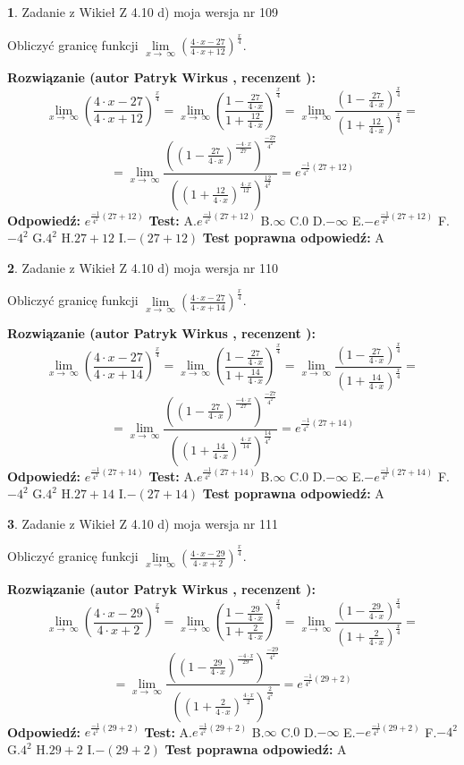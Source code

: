 \documentclass[12pt, a4paper]{article}
\theoremstyle{definition} %
\newtheorem{zad}{}
\newcommand{\zadStart}[1]{\begin{zad}#1\newline}
\newcommand{\zadStop}{\end{zad}}
\newcommand{\rozwStart}[2]{\noindent \textbf{Rozwiązanie (autor #1 , recenzent #2): }\newline}
\newcommand{\rozwStop}{\newline}
\newcommand{\odpStart}{\noindent \textbf{Odpowiedź:}\newline}
\newcommand{\odpStop}{\newline}
\newcommand{\testStart}{\noindent \textbf{Test:}\newline}
\newcommand{\testStop}{\newline}
\newcommand{\kluczStart}{\noindent \textbf{Test poprawna odpowiedź:}\newline}
\newcommand{\kluczStop}{\newline}
\begin{document}
\zadStart{Zadanie z Wikieł Z 4.10 d) moja wersja nr 109}


Obliczyć granicę funkcji  $\lim\limits_{x\to\ \infty}(\frac{4\cdot x-27}{4\cdot x+12})^{\frac{x}{4}}$.
\zadStop
\rozwStart{Patryk Wirkus}{}
$$\lim\limits_{x\to\ \infty}(\frac{4\cdot x-27}{4\cdot x+12})^{\frac{x}{4}} = \lim\limits_{x\to\ \infty}(\frac{1-\frac{27}{4\cdot x}}{1+\frac{12}{4\cdot x}})^{\frac{x}{4}}=\lim\limits_{x\to\ \infty}\frac{(1-\frac{27}{4\cdot x})^{\frac{x}{4}}}{(1+\frac{12}{4\cdot x})^{\frac{x}{4}}}=$$
$$=\lim\limits_{x\to\ \infty}\frac{((1-\frac{27}{4\cdot x})^{\frac{-4\cdot x}{27}})^{\frac{-27}{4^{2}}}}{((1+\frac{12}{4\cdot x})^{\frac{4\cdot x}{12}})^{\frac{12}{4^{2}}}}=e^{\frac{-1}{4^{2}}(27+12)}$$
\rozwStop
\odpStart
$e^{\frac{-1}{4^{2}}(27+12)}$
\odpStop
\testStart
A.$e^{\frac{-1}{4^{2}}(27+12)}$ B.$\infty$ C.$0$ D.$-\infty$ E.$-e^{\frac{-1}{4^{2}}(27+12)}$
F.$-4^{2}$ G.$4^{2}$
H.$27+12$
I.$-(27+12)$
\testStop
\kluczStart
A
\kluczStop



\zadStart{Zadanie z Wikieł Z 4.10 d) moja wersja nr 110}


Obliczyć granicę funkcji  $\lim\limits_{x\to\ \infty}(\frac{4\cdot x-27}{4\cdot x+14})^{\frac{x}{4}}$.
\zadStop
\rozwStart{Patryk Wirkus}{}
$$\lim\limits_{x\to\ \infty}(\frac{4\cdot x-27}{4\cdot x+14})^{\frac{x}{4}} = \lim\limits_{x\to\ \infty}(\frac{1-\frac{27}{4\cdot x}}{1+\frac{14}{4\cdot x}})^{\frac{x}{4}}=\lim\limits_{x\to\ \infty}\frac{(1-\frac{27}{4\cdot x})^{\frac{x}{4}}}{(1+\frac{14}{4\cdot x})^{\frac{x}{4}}}=$$
$$=\lim\limits_{x\to\ \infty}\frac{((1-\frac{27}{4\cdot x})^{\frac{-4\cdot x}{27}})^{\frac{-27}{4^{2}}}}{((1+\frac{14}{4\cdot x})^{\frac{4\cdot x}{14}})^{\frac{14}{4^{2}}}}=e^{\frac{-1}{4^{2}}(27+14)}$$
\rozwStop
\odpStart
$e^{\frac{-1}{4^{2}}(27+14)}$
\odpStop
\testStart
A.$e^{\frac{-1}{4^{2}}(27+14)}$ B.$\infty$ C.$0$ D.$-\infty$ E.$-e^{\frac{-1}{4^{2}}(27+14)}$
F.$-4^{2}$ G.$4^{2}$
H.$27+14$
I.$-(27+14)$
\testStop
\kluczStart
A
\kluczStop



\zadStart{Zadanie z Wikieł Z 4.10 d) moja wersja nr 111}


Obliczyć granicę funkcji  $\lim\limits_{x\to\ \infty}(\frac{4\cdot x-29}{4\cdot x+2})^{\frac{x}{4}}$.
\zadStop
\rozwStart{Patryk Wirkus}{}
$$\lim\limits_{x\to\ \infty}(\frac{4\cdot x-29}{4\cdot x+2})^{\frac{x}{4}} = \lim\limits_{x\to\ \infty}(\frac{1-\frac{29}{4\cdot x}}{1+\frac{2}{4\cdot x}})^{\frac{x}{4}}=\lim\limits_{x\to\ \infty}\frac{(1-\frac{29}{4\cdot x})^{\frac{x}{4}}}{(1+\frac{2}{4\cdot x})^{\frac{x}{4}}}=$$
$$=\lim\limits_{x\to\ \infty}\frac{((1-\frac{29}{4\cdot x})^{\frac{-4\cdot x}{29}})^{\frac{-29}{4^{2}}}}{((1+\frac{2}{4\cdot x})^{\frac{4\cdot x}{2}})^{\frac{2}{4^{2}}}}=e^{\frac{-1}{4^{2}}(29+2)}$$
\rozwStop
\odpStart
$e^{\frac{-1}{4^{2}}(29+2)}$
\odpStop
\testStart
A.$e^{\frac{-1}{4^{2}}(29+2)}$ B.$\infty$ C.$0$ D.$-\infty$ E.$-e^{\frac{-1}{4^{2}}(29+2)}$
F.$-4^{2}$ G.$4^{2}$
H.$29+2$
I.$-(29+2)$
\testStop
\kluczStart
A
\kluczStop
\end{document}
